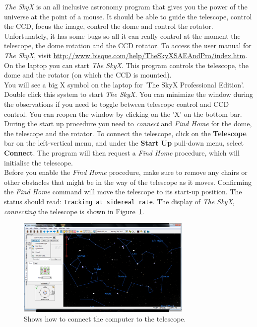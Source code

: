 \documentclass[12pt,twoside,a4paper]{report}
\begin{document}
\emph{The SkyX} is an all inclusive astronomy program that gives you the power of the 
universe at the point of a mouse. It should be able to guide the telescope, control the CCD, 
focus the image, control the dome and control the rotator. 
Unfortunately, it has some bugs so all it can really control at the moment the telescope, the 
dome rotation and the CCD rotator. To access the user manual for \emph{The SkyX}, 
visit \url{http://www.bisque.com/help/TheSkyXSAEAndPro/index.htm}.\\

On the laptop you can start \emph{The SkyX}. This program controls the telescope, the dome and the
rotator (on which the CCD is mounted).\\

You will see a big X symbol on the laptop for 'The SkyX Professional Edition'. Double click this
system to start \emph{The SkyX}. You can minimize the window during the observations if you need to 
toggle between telescope control and CCD control. You can reopen the window by clicking on the 'X' 
on the bottom bar.\\

During the start up procedure you need to \textit{connect} and \textit{Find Home} for the dome, 
the telescope and the rotator. To connect the telescope, click on the \textbf{Telescope} bar on the left-vertical menu, and 
under the \textbf{Start Up} pull-down menu, select \textbf{Connect}. The program will then request 
a \textit{Find Home} procedure, which will initialise the telescope.\\


Before you enable the \textit{Find Home} procedure, make sure to remove any chairs or other obstacles that might be in the
way of the telescope as it moves. Confirming the \textit{Find Home} command will move the telescope 
to its start-up position. The status should read: {\textcolor{PineGreen}{\tt Tracking at sidereal rate}}.
The display of \emph{The SkyX}, \textit{connecting} the telescope is shown in 
Figure~\ref{fig:connect_telescope}.\\

\begin{figure}[ht]
 \centering
    \includegraphics[width=0.75\textwidth]{documentation_images/connect_telescope.png}
    \caption{\label{fig:connect_telescope}Shows how to connect the computer to the telescope.}
\end{figure}
\end{document}
